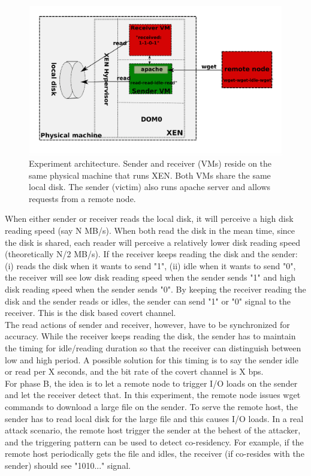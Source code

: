 \begin{figure}[hbtp]
\centering
\includegraphics[scale=0.5]{arch.eps}
\caption{Experiment architecture. Sender and receiver (VMs) reside on the 
same physical machine that runs XEN. Both VMs share the same 
local disk. The sender (victim) also runs apache server and allows 
requests from a remote node.}
\label{fig:arch}
\end{figure}

When either sender or receiver reads the local disk, it will 
perceive a high disk reading speed (say N MB/s). When both read the disk 
in the mean time, since the disk is shared, each reader will 
perceive a relatively lower disk reading speed (theoretically N/2 MB/s). 
If the receiver keeps reading the disk and the sender: (i) reads 
the disk when it wants to send "1", (ii) idle when it wants to send 
"0", the receiver will see low disk reading speed when the sender 
sends "1" and high disk reading speed when the sender sends "0". 
By keeping the receiver reading the disk and the sender reads or 
idles, the sender can send "1" or "0" signal to the receiver. This 
is the disk based covert channel.\\

The read actions of sender and receiver, however, have to be 
synchronized for accuracy. While the receiver keeps reading 
the disk, the sender has to maintain the timing for idle/reading 
duration so that the receiver can distinguish between low and 
high period. A possible solution for this timing is to say 
the sender idle or read per X seconds, and the bit rate of the 
covert channel is X bps.\\

For phase B, the idea is to let a remote node to trigger 
I/O loads on the sender and let the receiver detect that. 
In this experiment, the remote node issues wget commands to 
download a large file on the sender. To serve the remote 
host, the sender has to read local disk for the large file and 
this causes I/O loads. In a real attack scenario, the remote host 
trigger the sender at the behest of the attacker, and the triggering 
pattern can be used to detect co-residency. For example, if 
the remote host periodically gets the file and idles, the receiver 
(if co-resides with the sender) should see "1010..." signal.

